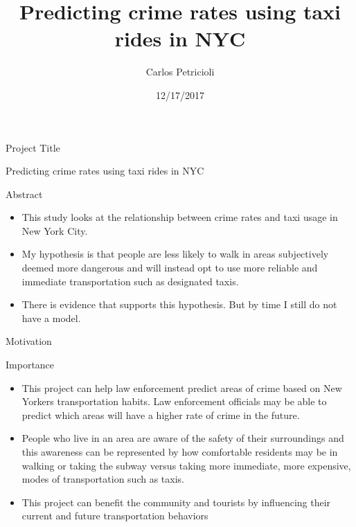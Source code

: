 \documentclass[10pt,ignorenonframetext,]{beamer}
\author{Carlos Petricioli }
\institute[New York University]{ New York University \\petricioli@nyu.edu }
\title{Predicting crime rates using taxi rides in NYC}
\date{12/17/2017}
\providecommand{\tightlist}{%
  \setlength{\itemsep}{0pt}\setlength{\parskip}{0pt}}
\begin{document}
\frame{\titlepage}

\begin{frame}

\begin{block}{Project Title}

Predicting crime rates using taxi rides in NYC

\end{block}

\begin{block}{Abstract}

\begin{itemize}
\tightlist
\item
  This study looks at the relationship between crime rates and taxi
  usage in New York City.
\item
  My hypothesis is that people are less likely to walk in areas
  subjectively deemed more dangerous and will instead opt to use more
  reliable and immediate transportation such as designated taxis.
\item
  There is evidence that supports this hypothesis. But by time I still
  do not have a model.
\end{itemize}

\end{block}

\end{frame}

\begin{frame}{%
\protect\hypertarget{motivation}{%
Motivation}}

\begin{block}{Importance}

\begin{itemize}
\tightlist
\item
  This project can help law enforcement predict areas of crime based on
  New Yorkers transportation habits. Law enforcement officials may be
  able to predict which areas will have a higher rate of crime in the
  future.
\item
  People who live in an area are aware of the safety of their
  surroundings and this awareness can be represented by how comfortable
  residents may be in walking or taking the subway versus taking more
  immediate, more expensive, modes of transportation such as taxis.
\item
  This project can benefit the community and tourists by influencing
  their current and future transportation behaviors
\end{itemize}

\end{block}

\end{frame}
\end{document}
